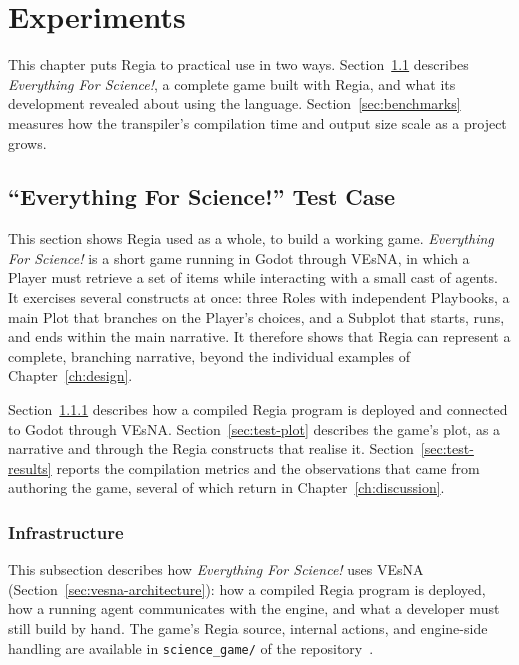 \chapter{Experiments}
\label{ch:experiments}


This chapter puts Regia to practical use in two ways. Section~\ref{sec:for-science} describes \emph{Everything For Science!}, a complete game built with Regia, and what its development revealed about using the language. Section~\ref{sec:benchmarks} measures how the transpiler's compilation time and output size scale as a project grows.

\section{``Everything For Science!'' Test Case}
\label{sec:for-science}


This section shows Regia used as a whole, to build a working game. \emph{Everything For Science!} is a short game running in Godot through VEsNA, in which a Player must retrieve a set of items while interacting with a small cast of agents. It exercises several constructs at once: three Roles with independent Playbooks, a main Plot that branches on the Player's choices, and a Subplot that starts, runs, and ends within the main narrative. It therefore shows that Regia can represent a complete, branching narrative, beyond the individual examples of Chapter~\ref{ch:design}.

Section~\ref{sec:test-infrastructure} describes how a compiled Regia program is deployed and connected to Godot through VEsNA. Section~\ref{sec:test-plot} describes the game's plot, as a narrative and through the Regia constructs that realise it. Section~\ref{sec:test-results} reports the compilation metrics and the observations that came from authoring the game, several of which return in Chapter~\ref{ch:discussion}.

\subsection{Infrastructure}
\label{sec:test-infrastructure}

This subsection describes how \emph{Everything For Science!} uses VEsNA (Section~\ref{sec:vesna-architecture}): how a compiled Regia program is deployed, how a running agent communicates with the engine, and what a developer must still build by hand. The game's Regia source, internal actions, and engine-side handling are available in \lstinline|science_game/| of the repository~\cite{RegiaRepo}.

